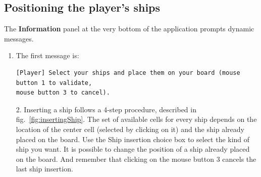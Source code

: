 \documentclass[twoside]{article}
\begin{document}
\subsection{Positioning the player's ships}


The \textbf{Information} panel at the very bottom of the application prompts dynamic messages.
\begin{enumerate}
\item The first message is:
\begin{verbatim}
[Player] Select your ships and place them on your board (mouse button 1 to validate,
mouse button 3 to cancel). 
\end{verbatim}
\end{enumerate}

\begin{enumerate}
\item[2.] Inserting a ship follows a 4-step procedure, described in fig.~\ref{fig:insertingShip}. The set of available cells for every ship depends on the location of the center cell (selected by clicking on it) and the ship already placed on the board. Use the Ship insertion choice box to select the kind of ship you want. It is possible to change the position of a ship already placed on the board. And remember that clicking on the mouse button 3 cancels the last ship insertion.
\end{enumerate}
\end{document}
